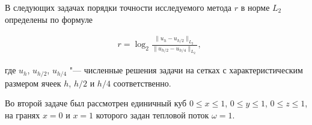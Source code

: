 
















В следующих задачах порядки точности исследуемого метода $r$ в норме $L_2$ определены по формуле \cite{Masyagin:bib:LadonkinaTishkin}

\begin{align}

&r=\log_{2}\frac{  \| u_h - u_{h/2} \|_{L_2}}{ \| u_{h/2} - u_{h/4} \|_{L_2}},

\end{align}

где $u_h$, $u_{h/2}$, $u_{h/4}$ "--- численные решения задачи на сетках с характеристическим размером ячеек $h$, $h/2$ и $h/4$ соответственно.



Во второй задаче был рассмотрен единичный куб $0\leq x\leq 1$, ${0\leq y\leq 1}$, $0\leq z\leq 1$, на гранях $x=0$ и $x=1$ которого задан тепловой поток $\omega=1$. 

